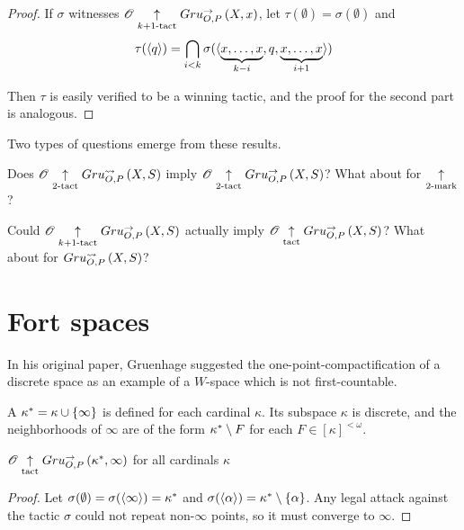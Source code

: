 \begin{proof}
  If $\sigma$ witnesses $\mathscr{O}\underset{k+1\text{-tact}}{\uparrow}Gru_{O,P}^{\to}\left({X},{x}\right)$,
  let $\tau(\emptyset)=\sigma(\emptyset)$ and
    \[
      \tau(\langle q\rangle)
        =
      \bigcap_{i< k}
      \sigma(\langle\underbrace{x,\dots,x}_{k-i},q,\underbrace{x,\dots,x}_{i+1}\rangle)
    \]

  Then $\tau$ is easily verified to be a winning tactic, and
  the proof for the second part is analogous.
\end{proof}

Two types of questions emerge from these results.

\begin{ques}
  Does $\mathscr{O} \underset{2\text{-tact}}{\uparrow} Gru_{O,P}^{\leadsto}\left({X},{S}\right)$ imply
  $\mathscr{O} \underset{2\text{-tact}}{\uparrow} Gru_{O,P}^{\to}\left({X},{S}\right)$? What about for $\underset{2\text{-mark}}{\uparrow}$?
\end{ques}

\begin{ques}
  Could $\mathscr{O} \underset{k+1\text{-tact}}{\uparrow} Gru_{O,P}^{\to}\left({X},{S}\right)$ actually imply
  $\mathscr{O} \underset{\text{tact}}{\uparrow} Gru_{O,P}^{\to}\left({X},{S}\right)$? What about for $Gru_{O,P}^{\leadsto}\left({X},{S}\right)$?
\end{ques}



\section{Fort spaces}

In his original paper, Gruenhage suggested the one-point-compactification of a
discrete space as an example of a $W$-space which is not first-countable.

\begin{defn}
  A  $\kappa^*=\kappa\cup\{\infty\}$ is defined
  for each cardinal $\kappa$. Its subspace $\kappa$ is discrete, and the
  neighborhoods of $\infty$ are of the form $\kappa^*\setminus F$
  for each $F\in[\kappa]^{<\omega}$.
\end{defn}

\begin{prop}\label{propFortTact}
  $\mathscr{O} \underset{\text{tact}}{\uparrow} Gru_{O,P}^{\to}\left({\kappa^*},{\infty}\right)$ for all cardinals $\kappa$
\end{prop}

\begin{proof}
  Let $\sigma(\emptyset)=\sigma(\langle\infty\rangle)=\kappa^*$ and
  $\sigma(\langle\alpha\rangle)=\kappa^*\setminus\{\alpha\}$. Any legal attack
  against the tactic $\sigma$ could not repeat non-$\infty$ points, so
  it must converge to $\infty$.
\end{proof}

